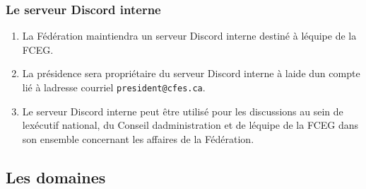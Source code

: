 \subsubsection{Le serveur Discord interne}
\label{le-serveur-discord-interne}

\begin{enumerate}
 \item
  La Fédération maintiendra un serveur Discord interne destiné à l\textquotesingle équipe de la FCEG.
 \item
  La présidence sera propriétaire du serveur Discord interne à l\textquotesingle aide d\textquotesingle un compte lié à l\textquotesingle adresse courriel \texttt{president@cfes.ca}.
 \item
  Le serveur Discord interne peut être utilisé pour les discussions au sein de l\textquotesingle exécutif national, du Conseil d\textquotesingle administration et de l\textquotesingle équipe de la FCEG dans son ensemble concernant les affaires de la Fédération.
\end{enumerate}

\subsection{Les domaines}
\label{les-domaines}

